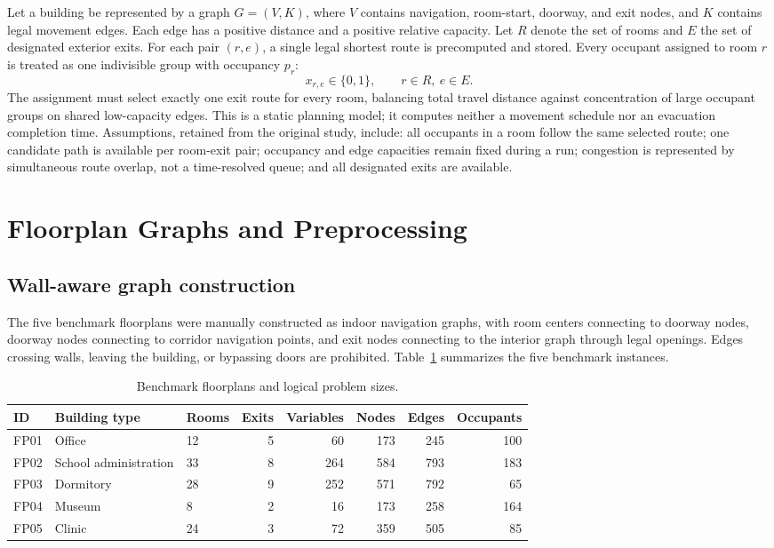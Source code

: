 \documentclass[11pt]{article}
\begin{document}
Let a building be represented by a graph $G=(V,K)$, where $V$ contains navigation, room-start, doorway, and exit nodes, and $K$ contains legal movement edges. Each edge has a positive distance and a positive relative capacity. Let $R$ denote the set of rooms and $E$ the set of designated exterior exits. For each pair $(r,e)$, a single legal shortest route is precomputed and stored. Every occupant assigned to room $r$ is treated as one indivisible group with occupancy $p_r$:
\begin{equation}
x_{r,e} \in \{0,1\}, \qquad r \in R,\ e \in E. \tag{1}
\end{equation}
The assignment must select exactly one exit route for every room, balancing total travel distance against concentration of large occupant groups on shared low-capacity edges. This is a static planning model; it computes neither a movement schedule nor an evacuation completion time. Assumptions, retained from the original study, include: all occupants in a room follow the same selected route; one candidate path is available per room-exit pair; occupancy and edge capacities remain fixed during a run; congestion is represented by simultaneous route overlap, not a time-resolved queue; and all designated exits are available.

\section{Floorplan Graphs and Preprocessing}

\subsection{Wall-aware graph construction}
The five benchmark floorplans were manually constructed as indoor navigation graphs, with room centers connecting to doorway nodes, doorway nodes connecting to corridor navigation points, and exit nodes connecting to the interior graph through legal openings. Edges crossing walls, leaving the building, or bypassing doors are prohibited. Table~\ref{tab:floorplans} summarizes the five benchmark instances.

\begin{table}[h]
\centering
\caption{Benchmark floorplans and logical problem sizes.}
\label{tab:floorplans}
\small
\begin{tabular}{lllrrrrr}
\toprule
ID & Building type & Rooms & Exits & Variables & Nodes & Edges & Occupants \\
\midrule
FP01 & Office & 12 & 5 & 60 & 173 & 245 & 100 \\
FP02 & School administration & 33 & 8 & 264 & 584 & 793 & 183 \\
FP03 & Dormitory & 28 & 9 & 252 & 571 & 792 & 65 \\
FP04 & Museum & 8 & 2 & 16 & 173 & 258 & 164 \\
FP05 & Clinic & 24 & 3 & 72 & 359 & 505 & 85 \\
\bottomrule
\end{tabular}
\end{table}
\end{document}
